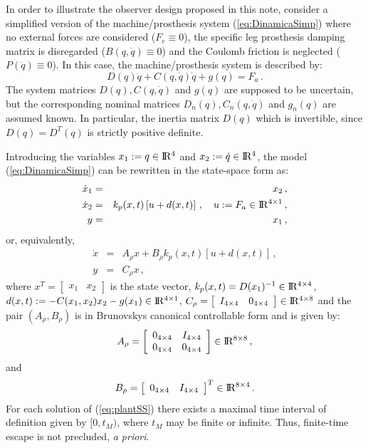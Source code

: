 \documentclass[letterpaper, 10 pt, journal, twocolumn]{IEEEtran}  %
\def\re{{\rm I}\! {\rm R}}
\theoremstyle{plain}
\theoremstyle{definition}
\theoremstyle{remark}
\begin{document}
In order to illustrate the observer design proposed in this note, consider a simplified version of the machine/prosthesis system (\ref{eq:DinamicaSimp}) where no external forces are considered ($F_e \equiv 0$), the specific leg prosthesis damping matrix is disregarded ($B(q,\dot{q}) \equiv 0$) and the  Coulomb friction is neglected  ($P(\dot{q}) \equiv 0$). In this case, the machine/prosthesis system is described by:
%
\begin{equation}
D(q)\ddot{q} + C(q,\dot{q})\dot{q}+g(q) = F_a\,.
\label{eq:DinamicaSimp}
\end{equation}
%
The system matrices $D(q), C(q,\dot{q})$ and $g(q)$ are supposed to be uncertain, but the corresponding nominal matrices  $D_n(q), C_n(q,\dot{q})$ and $g_n(q)$ are assumed known. In particular, the inertia matrix $D(q)$ which is invertible, since $D(q)=D^T(q)$ is strictly positive definite.

Introducing the variables $x_1:=q \in \re^4$ and $x_2:=\dot{q}\in \re^4$, the model (\ref{eq:DinamicaSimp}) can be rewritten in the state-space form as:
%
\begin{eqnarray}
\dot{x}_1&=& x_2\,, \\
\dot{x}_2 &=& k_p(x,t) \left[u+d(x,t)\right]\,, \quad u:=F_a \in \re^{4 \times 1}\,,\\
y &=&  x_1\,,
\end{eqnarray}
%
or, equivalently, 
%
\begin{eqnarray}
\dot{x} &=& A_\rho x +  B_\rho k_p(x,t) [u + d(x,t)]\,, \label{eq:plantSS} \\
y &=& C_\rho x\,,\label{eq:plantSaida} 
\end{eqnarray}
%
where $x^T= \left [ \begin{array}{cc} x_1 & x_2\end{array} \right ]$ is the state vector, $k_p(x,t)=D(x_1)^{-1} \in \re^{4 \times 4}$, $d(x,t):=-C(x_1,x_2) x_2-g(x_1) \in \re^{4 \times 1}$, $C_\rho=\left[\begin{array}{cc} I_{4 \times 4} & 0_{4 \times 4}\end{array} \right] \in \re^{4 \times 8}$ and the pair $(A_\rho, B_\rho)$ is in Brunovskys canonical controllable form and is given by:
%
$$A_\rho=\left[\begin{array}{cccc} 0_{4 \times 4} & I_{4 \times 4}\\
0_{4 \times 4} & 0_{4 \times 4}\end{array} \right] \in \re^{8 \times 8}\,,$$
%
and
%
$$B_\rho=\left[\begin{array}{cc}  0_{4 \times 4} & I_{4 \times 4} \end{array} \right]^T \in \re^{8 \times 4}\,.$$
%
For each solution of (\ref{eq:plantSS}) there exists a maximal
time interval of definition given by $[0,t_M)$, where $t_M$ may be
finite or infinite. Thus, finite-time escape is not precluded, {\em
a priori}.
\end{document}
